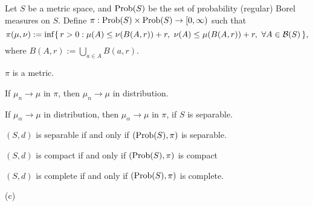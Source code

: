 \documentclass{../../large}
\begin{document}
\begin{prb}
Let $S$ be a metric space, and $\operatorname{Prob}(S)$ be the set of probability (regular) Borel measures on $S$.
Define $\pi:\operatorname{Prob}(S)\times\operatorname{Prob}(S)\to[0,\infty)$ such that
\[\pi(\mu,\nu):=\inf\{\,r>0:\mu(A)\le\nu(B(A,r))+r,\ \nu(A)\le\mu(B(A,r))+r,\ \forall A\in\cB(S)\,\},\]
where $B(A,r):=\bigcup_{a\in A}B(a,r)$.
\begin{parts}
\item $\pi$ is a metric.
\item If $\mu_n\to\mu$ in $\pi$, then $\mu_n\to\mu$ in distribution.
\item If $\mu_\alpha\to\mu$ in distribution, then $\mu_\alpha\to\mu$ in $\pi$, if $S$ is separable.
\item $(S,d)$ is separable if and only if $(\operatorname{Prob}(S),\pi)$ is separable.
\item $(S,d)$ is compact if and only if $(\operatorname{Prob}(S),\pi)$ is compact
\item $(S,d)$ is complete if and only if $(\operatorname{Prob}(S),\pi)$ is complete.
\end{parts}
\end{prb}
\begin{pf}
(c)
\end{pf}
\end{document}
